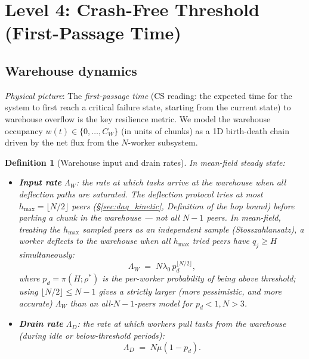 \documentclass[11pt,a4paper]{report}
\newtheorem{definition}{Definition}[section]
\newcommand{\rhostar}{\rho^{*}}
\newcommand{\lambdazero}{\lambda_0}
\newcommand{\pd}{p_d}
\begin{document}
\section{Level 4: Crash-Free Threshold (First-Passage Time)}

\subsection{Warehouse dynamics}

\emph{Physical picture}:
The \emph{first-passage time} (CS reading: the expected time for the system
to first reach a critical failure state, starting from the current state)
to warehouse overflow is the key resilience metric.
We model the warehouse occupancy $w(t) \in \{0, \ldots, C_W\}$
(in units of chunks) as a 1D birth-death chain driven by the net flux
from the $N$-worker subsystem.

\begin{definition}[Warehouse input and drain rates]
\label{def:warehouse-rates}
In mean-field steady state:
\begin{itemize}
  \item \textbf{Input rate} $\Lambda_W$: the rate at which tasks arrive
        at the warehouse when all deflection paths are saturated. The
        deflection protocol tries at most $h_{\max} = \lfloor N/2\rfloor$
        peers (\S\ref{sec:dag_kinetic}, Definition of the hop bound) before
        parking a chunk in the warehouse --- \emph{not} all $N-1$ peers.
        In mean-field, treating the $h_{\max}$ sampled peers as an
        independent sample (Stosszahlansatz), a worker deflects to the
        warehouse when all $h_{\max}$ tried peers have $q_j \geq H$
        simultaneously:
        \begin{equation}
          \Lambda_W \;=\; N\lambdazero\, \pd^{\lfloor N/2\rfloor},
          \label{eq:wh-input}
        \end{equation}
        where $\pd = \pi(H;\rhostar)$ is the per-worker probability of
        being above threshold; using $\lfloor N/2\rfloor \le N-1$ gives a
        strictly larger (more pessimistic, and more accurate) $\Lambda_W$
        than an all-$N-1$-peers model for $\pd<1,N>3$.
  \item \textbf{Drain rate} $\Lambda_D$: the rate at which workers pull
        tasks from the warehouse (during idle or below-threshold periods):
        \begin{equation}
          \Lambda_D \;=\; N\mu(1 - \pd).
          \label{eq:wh-drain}
        \end{equation}
\end{itemize}
\end{definition}
\end{document}
